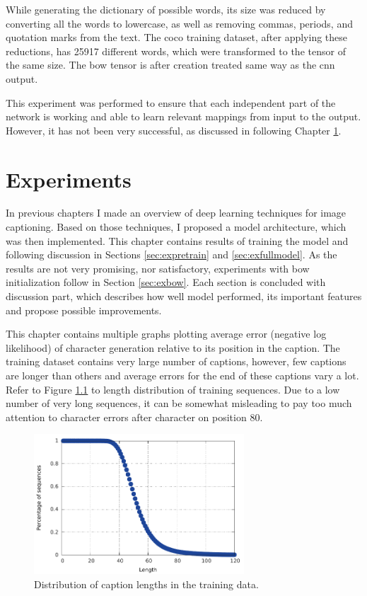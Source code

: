While generating the dictionary of possible words, its size was reduced by converting all the words to lowercase, as well as removing commas, periods, and quotation marks from the text. The \gls{coco} training dataset, after applying these reductions, has 25917 different words, which were transformed to the tensor of the same size. The \gls{bow} tensor is after creation treated same way as the \gls{cnn} output.

This experiment was performed to ensure that each independent part of the network is working and able to learn relevant mappings from input to the output. However, it has not been very successful, as discussed in following Chapter \ref{chp:experiments}.

\chapter{Experiments}\label{chp:experiments}

In previous chapters I made an overview of deep learning techniques for image captioning. Based on those techniques, I proposed a model architecture, which was then implemented. This chapter contains results of training the model and following discussion in Sections \ref{sec:expretrain} and \ref{sec:exfullmodel}. As the results are not very promising, nor satisfactory, experiments with \gls{bow} initialization follow in Section \ref{sec:exbow}. Each section is concluded with discussion part, which describes how well model performed, its important features and propose possible improvements.

This chapter contains multiple graphs plotting average error (negative log likelihood) of character generation relative to its position in the caption. The training dataset contains very large number of captions, however, few captions are longer than others and average errors for the end of these captions vary a lot. Refer to Figure \ref{fig:length} to length distribution of training sequences. Due to a low number of very long sequences, it can be somewhat misleading to pay too much attention to character errors after character on position 80.

\begin{figure}[!b]
	\centering
	\includegraphics[width=0.7\textwidth]{fig/sequence_length_distribution.pdf}
	\caption{Distribution of caption lengths in the training data.
		\label{fig:length}}
\end{figure}

